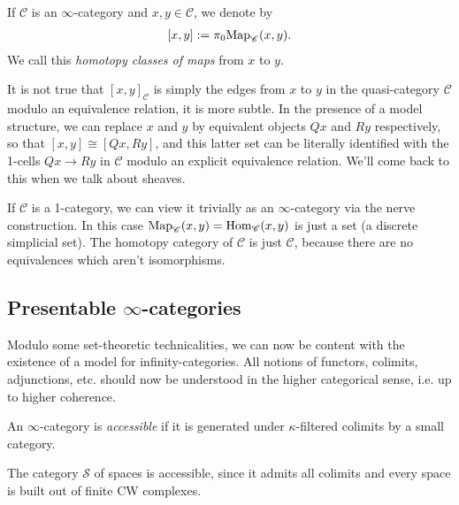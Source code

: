 \documentclass[11pt]{amsart}
\begin{document}
\begin{notation} If $\mathscr{C}$ is an $\infty$-category and $x,y\in\mathscr{C}$, we denote by
\begin{align*}
    \left[ x,y \right] := \pi_0 \mathrm{Map}_{\mathscr{C}}(x,y).
\end{align*}
We call this \textit{homotopy classes of maps} from $x$ to $y$.
\end{notation}

\begin{warning} It is not true that $\left[ x,y \right]_\mathscr{C}$ is simply the edges from $x$ to $y$ in the quasi-category $\mathscr{C}$ modulo an equivalence relation, it is more subtle. In the presence of a model structure, we can replace $x$ and $y$ by equivalent objects $Qx$ and $Ry$ respectively, so that $\left[ x,y \right] \cong \left[ Qx,Ry \right]$, and this latter set can be literally identified with the 1-cells $Qx \to Ry$ in $\mathscr{C}$ modulo an explicit equivalence relation. We'll come back to this when we talk about sheaves.
\end{warning}

\begin{example} If $\mathscr{C}$ is a 1-category, we can view it trivially as an $\infty$-category via the nerve construction. In this case $\mathrm{Map}_\mathscr{C}(x,y) = \mathrm{Hom}_\mathscr{C}(x,y)$ is just a set (a discrete simplicial set). The homotopy category of $\mathscr{C}$ is just $\mathscr{C}$, because there are no equivalences which aren't isomorphisms.
\end{example}


\subsection{Presentable $\infty$-categories}

Modulo some set-theoretic technicalities, we can now be content with the existence of a model for infinity-categories. All notions of functors, colimits, adjunctions, etc. should now be understood in the higher categorical sense, i.e. up to higher coherence.

\begin{definition} \cite[5.4.2.1]{HTT} An $\infty$-category is \textit{accessible} if it is generated under $\kappa$-filtered colimits by a small category.
\end{definition}

\begin{example}\label{ex:spaces-presentable}  The category $\mathcal{S}$ of spaces is accessible, since it admits all colimits and every space is built out of finite CW complexes.
\end{example}
\end{document}
